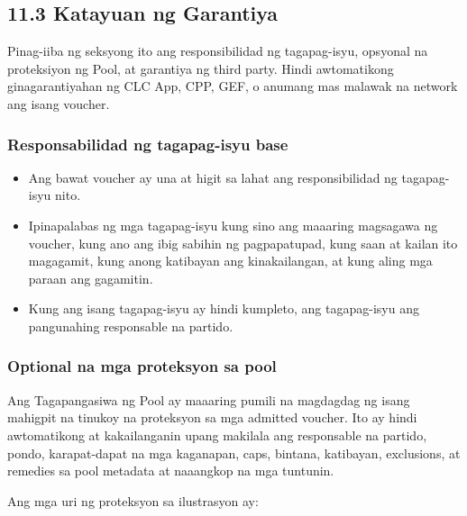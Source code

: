 \documentclass[11pt]{article}
\begin{document}
\subsection*{11.3 Katayuan ng Garantiya}

Pinag-iiba ng seksyong ito ang responsibilidad ng tagapag-isyu, opsyonal na proteksiyon ng Pool, at garantiya ng third party. Hindi awtomatikong ginagarantiyahan ng CLC App, CPP, GEF, o anumang mas malawak na network ang isang voucher.

\subsubsection*{Responsabilidad ng tagapag-isyu base}

\begin{itemize}[leftmargin=*]
\item Ang bawat voucher ay una at higit sa lahat ang responsibilidad ng tagapag-isyu nito.
\item Ipinapalabas ng mga tagapag-isyu kung sino ang maaaring magsagawa ng voucher, kung ano ang ibig sabihin ng pagpapatupad, kung saan at kailan ito magagamit, kung anong katibayan ang kinakailangan, at kung aling mga paraan ang gagamitin.
\item Kung ang isang tagapag-isyu ay hindi kumpleto, ang tagapag-isyu ang pangunahing responsable na partido.
\end{itemize}
\subsubsection*{Optional na mga proteksyon sa pool}

Ang Tagapangasiwa ng Pool ay maaaring pumili na magdagdag ng isang mahigpit na tinukoy na proteksyon sa mga admitted voucher. Ito ay hindi awtomatikong at kakailanganin upang makilala ang responsable na partido, pondo, karapat-dapat na mga kaganapan, caps, bintana, katibayan, exclusions, at remedies sa pool metadata at naaangkop na mga tuntunin.

Ang mga uri ng proteksyon sa ilustrasyon ay:
\end{document}
